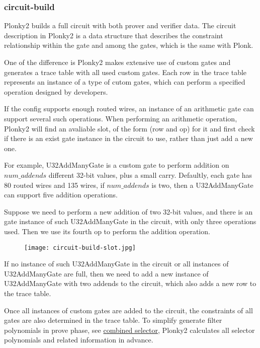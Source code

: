 \subsubsection{circuit-build}
    \label{circuit-build}

    Plonky2 builds a full circuit with both prover and verifier data. The circuit
    description in Plonky2 is a data structure that describes the constraint
    relationship within the gate and among the gates, which is the same with Plonk.
    
    One of the difference is Plonky2 makes extensive use of custom gates and generates
    a trace table with all used custom gates. Each row in the trace table represents
    an instance of a type of cutom gates, which can perform a specified operation
    designed by developers.

    If the config supports enough routed wires, an instance of an arithmetic gate can
    support several such operations. When performing an arithmetic operation, Plonky2 
    will find an avaliable slot, of the form (row and op) for it and first check if
    there is an exist gate instance in the circuit to use, rather than just add a new
    one.
    
    For example, U32AddManyGate is a custom gate to perform addition on $ num\_addends $ 
    different 32-bit values, plus a small carry. Defaultly, each gate has 80 routed wires
    and 135 wires, if $ num\_addends $ is two, then a U32AddManyGate can support five
    addition operations.
    
    Suppose we need to perform a new addition of two 32-bit values, and there is an gate
    instance of such U32AddManyGate in the circuit, with only three operations used. 
    Then we use its fourth op to perform the addition operation.

    \begin{figure}[!ht]
        \centering
        \texttt{[image: circuit-build-slot.jpg]}
        \label{fig:circuit-build-slot}
    \end{figure}

    If no instance of such U32AddManyGate in the circuit or all instances of U32AddManyGate are
    full, then we need to add a new instance of U32AddManyGate with two addends to the circuit,
    which also adds a new row to the trace table.

    Once all instances of custom gates are added to the circuit, the constraints of all gates
    are also determined in the trace table. To simplify generate filter polynomials in prove
    phase, see \href{https://hackmd.io/@sin7y/H10EO2Z5q#Combined-selector}{combined selector},
    Plonky2 calculates all selector polynomials and related information in advance.

